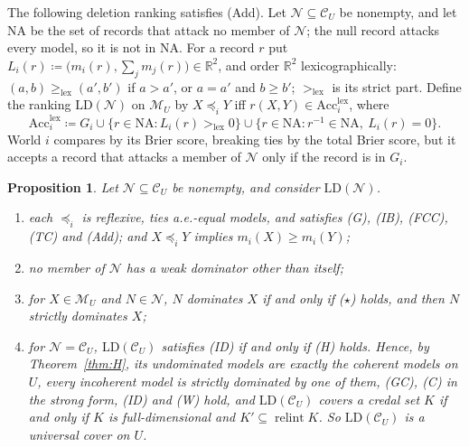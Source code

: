 \documentclass[11pt]{article}
\newcommand{\R}{\mathbb{R}}
\newcommand{\M}{\mathcal{M}}
\newcommand{\CC}{\mathcal{C}}
\newcommand{\NN}{\mathcal{N}}
\newcommand{\Acc}{\mathrm{Acc}}
\DeclareMathOperator{\relint}{relint}
\theoremstyle{plain}
\newtheorem{proposition}[theorem]{Proposition}
\theoremstyle{definition}
\theoremstyle{remark}
\begin{document}
The following deletion ranking satisfies (Add). Let $\NN\subseteq\CC_U$ be nonempty, and let $\mathrm{NA}$ be the set of records that
attack no member of $\NN$; the null record attacks every model, so it is not in
$\mathrm{NA}$. For a record $r$ put $L_i(r)\coloneqq\bigl(m_i(r),\sum_jm_j(r)\bigr)\in
\R^2$, and order $\R^2$ lexicographically: $(a,b)\ge_{\mathrm{lex}}(a',b')$ if $a>a'$,
or $a=a'$ and $b\ge b'$; $>_{\mathrm{lex}}$ is its strict part. Define the ranking $\mathrm{LD}(\NN)$ on $\M_U$ by
$X\preceq_iY$ iff $r(X,Y)\in\Acc^{\mathrm{lex}}_i$, where
\[
  \Acc^{\mathrm{lex}}_i\coloneqq G_i\cup\{r\in\mathrm{NA}:L_i(r)>_{\mathrm{lex}}0\}
  \cup\{r\in\mathrm{NA}:r^{-1}\in\mathrm{NA},\ L_i(r)=0\}.
\]
World $i$ compares by its Brier score, breaking ties by the total Brier score, but it
accepts a record that attacks a member of $\NN$ only if the record is in $G_i$.

\begin{proposition}\label{prop:lex}
Let $\NN\subseteq\CC_U$ be nonempty, and consider $\mathrm{LD}(\NN)$.
\begin{enumerate}[label=(\alph*)]
  \item each $\preceq_i$ is reflexive, ties a.e.-equal models, and satisfies (G), (IB),
  (FCC), (TC) and (Add); and $X\preceq_iY$ implies $m_i(X)\ge m_i(Y)$;
  \item no member of $\NN$ has a weak dominator other than itself;
  \item for $X\in\M_U$ and $N\in\NN$, $N$ dominates $X$ if and only if ($\star$) holds,
  and then $N$ strictly dominates $X$;
  \item for $\NN=\CC_U$, $\mathrm{LD}(\CC_U)$ satisfies (ID) if and only if (H) holds.
  Hence, by Theorem~\ref{thm:H}, its undominated models are exactly the coherent models on
  $U$, every incoherent model is strictly dominated by one of them, (GC), (C) in the
  strong form, (ID) and (W) hold, and $\mathrm{LD}(\CC_U)$ covers a credal set $K$ if
  and only if $K$ is full-dimensional and $K'\subseteq\relint K$. So $\mathrm{LD}(\CC_U)$
  is a universal cover on $U$.
\end{enumerate}
\end{proposition}
\end{document}
